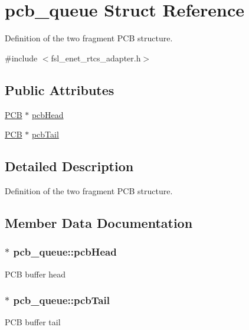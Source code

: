 \hypertarget{structpcb__queue}{}\section{pcb\+\_\+queue Struct Reference}
\label{structpcb__queue}


Definition of the two fragment P\+CB structure.  




{\ttfamily \#include $<$fsl\+\_\+enet\+\_\+rtcs\+\_\+adapter.\+h$>$}

\subsection*{Public Attributes}
\begin{DoxyCompactItemize}
\item 
\hyperlink{group__enet__rtcs__adaptor_ga938e427dbd7e47ad2b2659ae0de7c662}{P\+CB} $\ast$ \hyperlink{structpcb__queue_af28072db3574deb064f3eba04f2dbb22}{pcb\+Head}
\item 
\hyperlink{group__enet__rtcs__adaptor_ga938e427dbd7e47ad2b2659ae0de7c662}{P\+CB} $\ast$ \hyperlink{structpcb__queue_afcc00e82648d011f243e72ef089c16fa}{pcb\+Tail}
\end{DoxyCompactItemize}


\subsection{Detailed Description}
Definition of the two fragment P\+CB structure. 

\subsection{Member Data Documentation}
\subsubsection[{\texorpdfstring{pcb\+Head}{pcbHead}}]{$\ast$ pcb\+\_\+queue\+::pcb\+Head}\hypertarget{structpcb__queue_af28072db3574deb064f3eba04f2dbb22}{}\label{structpcb__queue_af28072db3574deb064f3eba04f2dbb22}
P\+CB buffer head 
\subsubsection[{\texorpdfstring{pcb\+Tail}{pcbTail}}]{$\ast$ pcb\+\_\+queue\+::pcb\+Tail}\hypertarget{structpcb__queue_afcc00e82648d011f243e72ef089c16fa}{}\label{structpcb__queue_afcc00e82648d011f243e72ef089c16fa}
P\+CB buffer tail 

